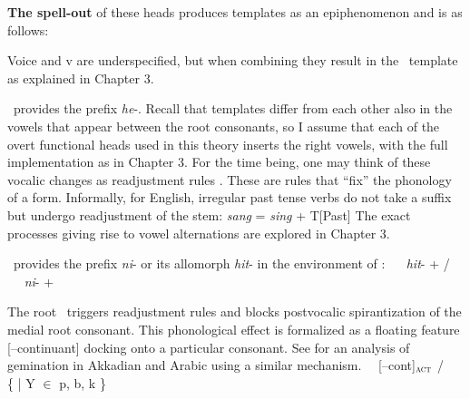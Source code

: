 \textbf{The spell-out} of these heads produces templates as an epiphenomenon and is as follows: 

Voice and v are underspecified, but when combining they result in the \tkal~template as explained in Chapter 3.

\vd~provides the prefix \emph{he}-. Recall that templates differ from each other also in the vowels that appear between the root consonants, so I assume that each of the overt functional heads used in this theory inserts the right vowels, with the full implementation as in Chapter 3. For the time being, one may think of these vocalic changes as readjustment rules \citep{embickhalle05}. These are rules that ``fix'' the phonology of a form. Informally, for English, irregular past tense verbs do not take a suffix but undergo readjustment of the stem:
\ex \emph{sang} = \emph{sing} + T[Past]
\xe
The exact processes giving rise to vowel alternations are explored in Chapter 3.

\vz~provides the prefix \emph{ni}- or its allomorph \emph{hit}- in the environment of \va:
\pex
\a \vz~\lra~ \emph{hit}- +  / \trace~\va
\a \vz~\lra~ \emph{ni}- + 
\xe

The root \va~triggers readjustment rules and blocks postvocalic spirantization of the medial root consonant. This phonological effect is formalized as a floating feature [--continuant] docking onto a particular consonant. See \cite{katie13} for an analysis of gemination in Akkadian and Arabic using a similar mechanism.
\ex \va~\lra~[--cont]$_{\gsc{ACT}}$ / \trace~ \{  | Y $\in$ p, b, k \}
\xe

